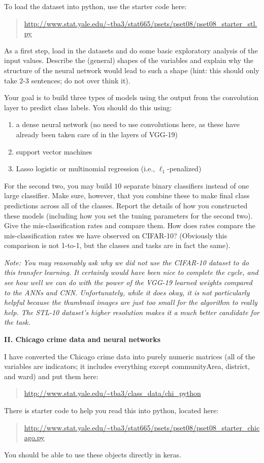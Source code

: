 \documentclass[12pt]{article}
\begin{document}
To load the dataset into python, use the starter code here:
\begin{quote}
\url{http://www.stat.yale.edu/~tba3/stat665/psets/pset08/pset08_starter_stl.py}
\end{quote}

As a first step, load in the datasets and do some basic exploratory analysis
of the input values. Describe the (general) shapes of the variables and
explain why the structure of the neural network would lead to such a
shape (hint: this should only take 2-3 sentences; do not over think it).

Your goal is to build three types of models using the output from the
convolution layer to predict class labels. You should do this using:
\begin{enumerate}
\item a dense neural network (no need to use convolutions here, as these have
already been taken care of in the layers of VGG-19)
\item support vector machines
\item Lasso logistic or multinomial regression (i.e., $\ell_1$-penalized)
\end{enumerate}
For the second two, you may build $10$ separate binary classifiers instead
of one large classifier. Make sure, however, that you combine these to
make final class predictions across all of the classes. Report the details of
how you constructed these models (including how you set the tuning parameters
for the second two). Give the mis-classification rates and compare them.
How does rates compare the mis-classification rates we have observed on
CIFAR-10? (Obviously this comparison is not 1-to-1, but the classes
and tasks are in fact the same).

\textit{Note: You may reasonably ask why we did not use the CIFAR-10 dataset
to do this transfer learning. It certainly would have been nice to
complete the cycle, and see how well we can do with the power of the VGG-19
learned weights compared to the ANNs and CNN. Unfortunately, while it does okay,
it is not particularly helpful because the thumbnail images are just too
small for the algorithm to really help. The STL-10 dataset's higher
resolution makes it a much better candidate for the task.}

\textbf{II. Chicago crime data and neural networks}

I have converted the Chicago crime data into purely numeric matrices
(all of the variables are indicators; it includes everything
except communityArea, district, and ward) and put them here:
\begin{quote}
\url{http://www.stat.yale.edu/~tba3/class_data/chi_python}
\end{quote}
There is starter code to help you read this into python, located
here:
\begin{quote}
\url{http://www.stat.yale.edu/~tba3/stat665/psets/pset08/pset08_starter_chicago.py}
\end{quote}
You should be able to use these objects directly in keras.
\end{document}
